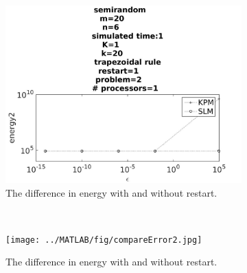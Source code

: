 
\begin{figure}[H]
        \centering
        \begin{subfigure}[b]{0.3\textwidth}
                \includegraphics[width=\textwidth]{../MATLAB/fig/compareEnergy2.jpg}
                \caption{ The difference in energy with and without restart. }
                \label{fig:compareEnergy}
        \end{subfigure}
        ~
        \begin{subfigure}[b]{0.3\textwidth}
                \texttt{[image: ../MATLAB/fig/compareError2.jpg]}
                \caption{ The difference in energy with and without restart. }
                \label{fig:compareEnergy}
        \end{subfigure}
        ~
        \begin{subfigure}[b]{0.3\textwidth}

\end{subfigure}
\end{figure}
